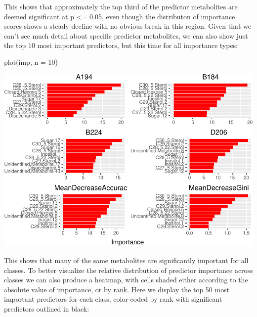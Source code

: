This shows that approximately the top third of the predictor metabolites
are deemed significant at p \textless{}= 0.05, even though the
distributon of importance scores shows a steady decline with no obvious
break in this region. Given that we can't see much detail about specific
predictor metabolites, we can also show just the top 10 most important
predictors, but this time for all importance types:

\begin{Schunk}
\begin{Sinput}
plot(imp, n = 10)
\end{Sinput}

\includegraphics{archer_files/figure-latex/plot_imp2-1} \end{Schunk}

This shows that many of the same metabolites are significantly important
for all classes. To better visualize the relative distribution of
predictor importance across classes we can also produce a heatmap, with
cells shaded either according to the absolute value of importance, or by
rank. Here we display the top 50 most important predictors for each
class, color-coded by rank with significant predictors outlined in
black:

